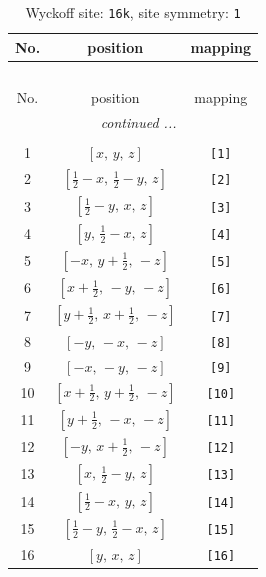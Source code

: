 \documentclass[fleqn,8pt]{jsarticle}
\begin{document}
\begin{longtable}{ccc}
\caption{Wyckoff site: {\tt 16k}, site symmetry: {\tt 1}}
 \\
 \hline \hline
No. & position & mapping \\ \hline \endfirsthead

\multicolumn{2}{l}{\tablename\ \thetable{}} \\
 \hline \hline
No. & position & mapping \\ \hline \endhead

 \hline \hline
\multicolumn{2}{r}{\footnotesize\it continued ...} \\ \endfoot

 \hline \hline
\multicolumn{2}{r}{} \\ \endlastfoot

1 & $\left[ x,\, y,\, z \right]$ & {\tt [1]} \\ \hline
2 & $\left[ \frac{1}{2} - x,\, \frac{1}{2} - y,\, z \right]$ & {\tt [2]} \\ \hline
3 & $\left[ \frac{1}{2} - y,\, x,\, z \right]$ & {\tt [3]} \\ \hline
4 & $\left[ y,\, \frac{1}{2} - x,\, z \right]$ & {\tt [4]} \\ \hline
5 & $\left[ - x,\, y + \frac{1}{2},\, - z \right]$ & {\tt [5]} \\ \hline
6 & $\left[ x + \frac{1}{2},\, - y,\, - z \right]$ & {\tt [6]} \\ \hline
7 & $\left[ y + \frac{1}{2},\, x + \frac{1}{2},\, - z \right]$ & {\tt [7]} \\ \hline
8 & $\left[ - y,\, - x,\, - z \right]$ & {\tt [8]} \\ \hline
9 & $\left[ - x,\, - y,\, - z \right]$ & {\tt [9]} \\ \hline
10 & $\left[ x + \frac{1}{2},\, y + \frac{1}{2},\, - z \right]$ & {\tt [10]} \\ \hline
11 & $\left[ y + \frac{1}{2},\, - x,\, - z \right]$ & {\tt [11]} \\ \hline
12 & $\left[ - y,\, x + \frac{1}{2},\, - z \right]$ & {\tt [12]} \\ \hline
13 & $\left[ x,\, \frac{1}{2} - y,\, z \right]$ & {\tt [13]} \\ \hline
14 & $\left[ \frac{1}{2} - x,\, y,\, z \right]$ & {\tt [14]} \\ \hline
15 & $\left[ \frac{1}{2} - y,\, \frac{1}{2} - x,\, z \right]$ & {\tt [15]} \\ \hline
16 & $\left[ y,\, x,\, z \right]$ & {\tt [16]} \\
\end{longtable}
\end{document}
